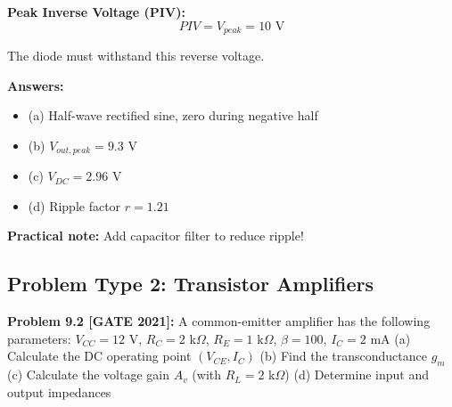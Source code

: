 \documentclass[12pt,a4paper]{article}
\begin{document}
\begin{solution}
\textbf{Peak Inverse Voltage (PIV):}
$$PIV = V_{peak} = 10\text{ V}$$

The diode must withstand this reverse voltage.

\textbf{Answers:}
\begin{itemize}
    \item (a) Half-wave rectified sine, zero during negative half
    \item (b) $V_{out,peak} = 9.3$ V
    \item (c) $V_{DC} = 2.96$ V
    \item (d) Ripple factor $r = 1.21$
\end{itemize}

\textbf{Practical note:} Add capacitor filter to reduce ripple!
\end{solution}

\subsection{Problem Type 2: Transistor Amplifiers}

\textbf{Problem 9.2 [GATE 2021]:} A common-emitter amplifier has the following parameters:
$V_{CC} = 12$ V, $R_C = 2$ k$\Omega$, $R_E = 1$ k$\Omega$, $\beta = 100$, $I_C = 2$ mA
(a) Calculate the DC operating point $(V_{CE}, I_C)$
(b) Find the transconductance $g_m$
(c) Calculate the voltage gain $A_v$ (with $R_L = 2$ k$\Omega$)
(d) Determine input and output impedances
\end{document}
